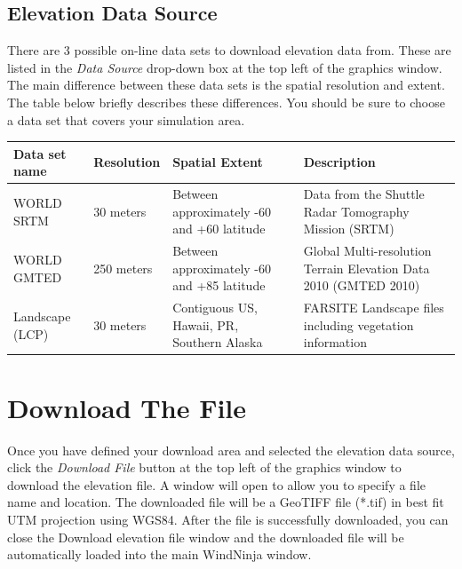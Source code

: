 \documentclass[12pt]{article}
\begin{document}
\subsection*{Elevation Data Source}

There are 3 possible on-line data sets to download elevation data from.  These are listed in the \textit{Data Source} drop-down box at the top left of the graphics window.  The main difference between these data sets is the spatial resolution and extent.  The table below briefly describes these differences.  You should be sure to choose a data set that covers your simulation area.

\begin{center}
    \begin{tabular}{| l | l | p{1.75in} | p{1.8in} |}
    \hline
    Data set name & Resolution & Spatial Extent & Description \\ \hline

    WORLD SRTM & 30 meters & Between approximately -60 and +60 latitude &
    Data from the Shuttle Radar Tomography Mission (SRTM) \\ \hline

    WORLD GMTED & 250 meters & Between approximately -60 and +85 latitude &
    Global Multi-resolution Terrain Elevation Data 2010 (GMTED 2010) \\ \hline

    Landscape (LCP) & 30 meters & Contiguous US, Hawaii, PR, Southern Alaska &
    FARSITE Landscape files including vegetation information \\ \hline
\end{tabular}
\end{center}


\section*{Download The File}
Once you have defined your download area and selected the elevation data source, click the \textit{Download File} button at the top left of the graphics window to download the elevation file.  A window will open to allow you to specify a file name and location. The downloaded file will be a GeoTIFF file (*.tif) in best fit UTM projection using WGS84. After the file is successfully downloaded, you can close the Download elevation file window and the downloaded file will be automatically loaded into the main WindNinja window.
\end{document}
